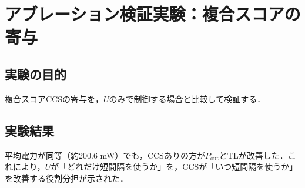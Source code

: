 \section{アブレーション検証実験：複合スコアの寄与}
\label{sec:exp_ablation_ccs}

\subsection{実験の目的}

複合スコアCCSの寄与を，$U$のみで制御する場合と比較して検証する．

\subsection{実験結果}

平均電力が同等（約200.6 mW）でも，CCSありの方が$P_{\mathrm{out}}$とTLが改善した．これにより，$U$が「どれだけ短間隔を使うか」を，CCSが「いつ短間隔を使うか」を改善する役割分担が示された．

\clearpage
